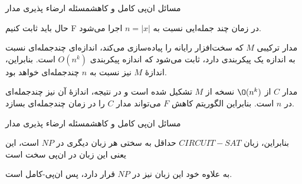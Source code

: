 \begin{itemframe-s}{مسائل ان‌پی کامل و کاهش}{مسئله ارضاء پذیری مدار}

\item[-]
حال باید ثابت کنیم F در زمان چند جمله‌ایی نسبت به
$n = |x|$
اجرا می‌شود.

\item[-]
مدار ترکیبی $M$ که سخت‌افزار رایانه را پیاده‌سازی می‌کند، اندازه‌ای چندجمله‌ای نسبت به اندازه یک پیکربندی دارد، ثابت می‌شود که اندازه پیکربندی
$O(n^k)$
است. بنابراین، اندازهٔ $M$ نیز نسبت به $n$ چندجمله‌ای خواهد بود.

\item[-]
مدار $C$ از $\O(n^k)$ نسخه از $M$ تشکیل شده است و در نتیجه، اندازهٔ آن نیز چندجمله‌ای در $n$ است.
بنابراین الگوریتم کاهش $F$ می‌تواند مدار $C$ را در زمان چندجمله‌ای بسازد.

\end{itemframe-s}


\begin{itemframe-s}{مسائل ان‌پی کامل و کاهش}{مسئله ارضاء پذیری مدار}
\item[-]
بنابراین، زبان $CIRCUIT-SAT$ حداقل به سختی هر زبان دیگری در $NP$ است، این یعنی این زبان در ان‌پی سخت است

\item[-]
به علاوه خود این زبان نیز در
$NP$
قرار دارد، پس ان‌پی‌-کامل است.

\end{itemframe-s}
